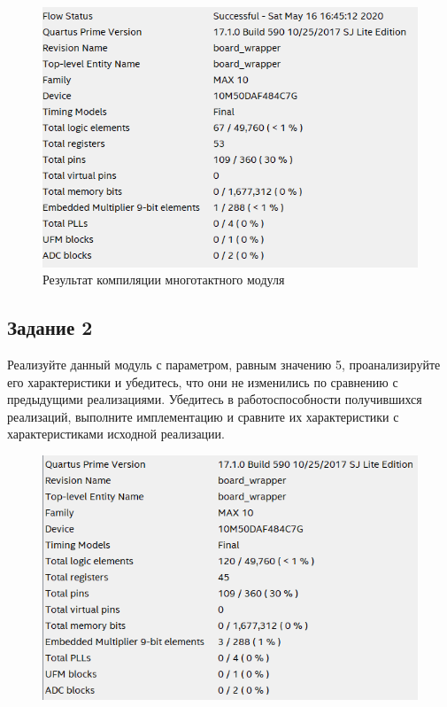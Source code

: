 \documentclass[a4paper,14pt]{article}
\begin{document}
		\begin{figure}[H]
			\centering
			\includegraphics[width=0.8\linewidth]{images/z1_06}
			\caption{Результат компиляции многотактного модуля}
			\label{fig:z106}
		\end{figure}
		
	
	\subsection{Задание 2}
	
	Реализуйте данный модуль с параметром, равным значению 5, проанализируйте его характеристики и убедитесь, что они не изменились по сравнению с предыдущими	реализациями. Убедитесь в работоспособности получившихся реализаций, выполните имплементацию и сравните их характеристики с характеристиками исходной реализации.
	
	\begin{figure}[H]
		\centering
		\includegraphics[width=0.8\linewidth]{images/z2_4}
		\caption{}
		\label{fig:z24}
	\end{figure}
	
\end{document}
